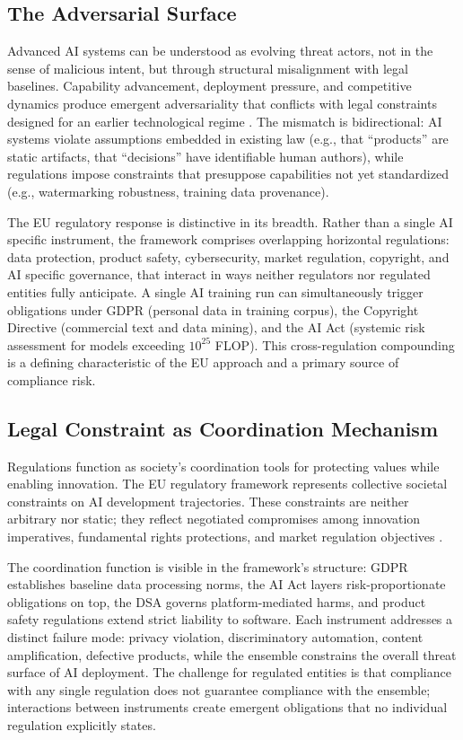 \documentclass[11pt,a4paper]{article}
\begin{document}
\subsection{The Adversarial Surface}

Advanced AI systems can be understood as evolving threat actors, not in the sense of malicious intent, but through structural misalignment with legal baselines. Capability advancement, deployment pressure, and competitive dynamics produce emergent adversariality that conflicts with legal constraints designed for an earlier technological regime \cite{bostrom2014}. The mismatch is bidirectional: AI systems violate assumptions embedded in existing law (e.g., that ``products'' are static artifacts, that ``decisions'' have identifiable human authors), while regulations impose constraints that presuppose capabilities not yet standardized (e.g., watermarking robustness, training data provenance).

The EU regulatory response is distinctive in its breadth. Rather than a single AI specific instrument, the framework comprises overlapping horizontal regulations: data protection, product safety, cybersecurity, market regulation, copyright, and AI specific governance, that interact in ways neither regulators nor regulated entities fully anticipate. A single AI training run can simultaneously trigger obligations under GDPR (personal data in training corpus), the Copyright Directive (commercial text and data mining), and the AI Act (systemic risk assessment for models exceeding $10^{25}$ FLOP). This cross-regulation compounding is a defining characteristic of the EU approach and a primary source of compliance risk.

\subsection{Legal Constraint as Coordination Mechanism}

Regulations function as society's coordination tools for protecting values while enabling innovation. The EU regulatory framework represents collective societal constraints on AI development trajectories. These constraints are neither arbitrary nor static; they reflect negotiated compromises among innovation imperatives, fundamental rights protections, and market regulation objectives \cite{jobin2019}.

The coordination function is visible in the framework's structure: GDPR establishes baseline data processing norms, the AI Act layers risk-proportionate obligations on top, the DSA governs platform-mediated harms, and product safety regulations extend strict liability to software. Each instrument addresses a distinct failure mode: privacy violation, discriminatory automation, content amplification, defective products, while the ensemble constrains the overall threat surface of AI deployment. The challenge for regulated entities is that compliance with any single regulation does not guarantee compliance with the ensemble; interactions between instruments create emergent obligations that no individual regulation explicitly states.
\end{document}
